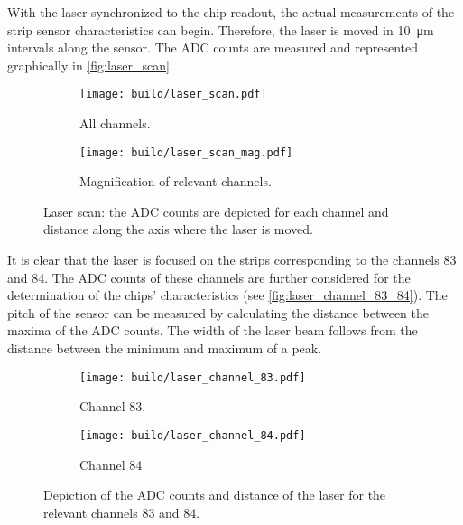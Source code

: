 With the laser synchronized to the chip readout, the actual measurements of the strip sensor characteristics can begin. Therefore, the laser is moved 
in \qty{10}{\micro\metre} intervals along the sensor. The ADC counts are measured and represented graphically in \autoref{fig:laser_scan}.
\begin{figure}
    \centering
    \begin{subfigure}{0.49\textwidth}
        \texttt{[image: build/laser\_scan.pdf]}
        \caption{All channels.}
        \label{fig:laser_scan_all_channels}
    \end{subfigure}
    \hfill
    \begin{subfigure}{0.49\textwidth}
        \texttt{[image: build/laser\_scan\_mag.pdf]}
        \caption{Magnification of relevant channels.}
        \label{fig:laser_scan_mag}
    \end{subfigure}
    \caption{Laser scan: the ADC counts are depicted for each channel and distance along the axis where the laser is moved.}
    \label{fig:laser_scan}
\end{figure}

It is clear that the laser is focused on the strips corresponding to the channels 83 and 84. The ADC counts of these channels are further considered for the determination of 
the chips' characteristics (see \autoref{fig:laser_channel_83_84}). The pitch of the sensor can be measured by calculating the distance between the maxima of the ADC counts. 
The width of the laser beam follows from the distance between the minimum and maximum of a peak. 
\begin{figure}
    \centering
    \begin{subfigure}{0.49\textwidth}
        \texttt{[image: build/laser\_channel\_83.pdf]}
        \caption{Channel 83.}
        \label{fig:laser_channel_83}
    \end{subfigure}
    \hfill
    \begin{subfigure}{0.49\textwidth}
        \texttt{[image: build/laser\_channel\_84.pdf]}
        \caption{Channel 84}
        \label{fig:laser_channel_84}
    \end{subfigure}
    \caption{Depiction of the ADC counts and distance of the laser for the relevant channels 83 and 84.}
    \label{fig:laser_channel_83_84}
\end{figure}

